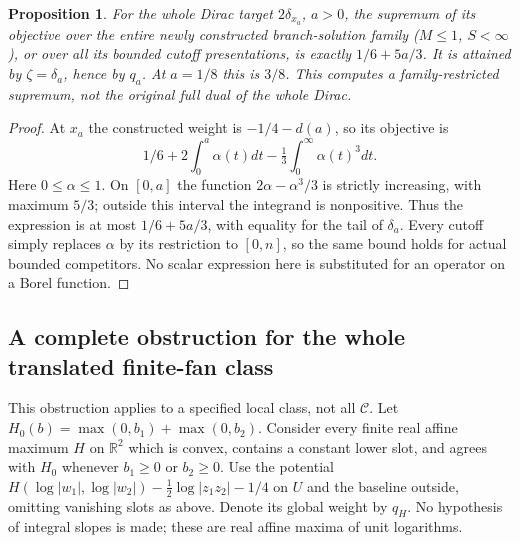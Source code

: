 \documentclass[11pt]{article}
\newtheorem{proposition}[theorem]{Proposition}
\newcommand{\C}{\mathcal C}
\begin{document}
\begin{proposition}\label{branch:diracobjective}
For the whole Dirac target $2\delta_{x_a}$, $a>0$, the supremum of its
objective over the entire newly constructed branch-solution family
($M\le1$, $S<\infty$), or over all its bounded cutoff presentations, is
exactly $1/6+5a/3$. It is attained by $\zeta=\delta_a$, hence by $q_a$.
At $a=1/8$ this is $3/8$. This computes a family-restricted supremum,
not the original full dual of the whole Dirac.
\end{proposition}
\begin{proof}
At $x_a$ the constructed weight is $-1/4-d(a)$, so its objective is
\[
 1/6+2\int_0^a\alpha(t)dt-\tfrac13\int_0^\infty\alpha(t)^3dt.
\]
Here $0\le\alpha\le1$. On $[0,a]$ the function
$2\alpha-\alpha^3/3$ is strictly increasing, with maximum $5/3$;
outside this interval the integrand is nonpositive. Thus the expression
is at most $1/6+5a/3$, with equality for the tail of $\delta_a$.
Every cutoff simply replaces $\alpha$ by its restriction to $[0,n]$,
so the same bound holds for actual bounded competitors. No scalar
expression here is substituted for an operator on a Borel function.
\end{proof}

\subsection{A complete obstruction for the whole translated finite-fan class}
This obstruction applies to a specified local class, not all $\C$.
Let $H_0(b)=\max(0,b_1)+\max(0,b_2)$. Consider every finite real affine
maximum $H$ on $\mathbb R^2$ which is convex, contains a constant lower
slot, and agrees with $H_0$ whenever $b_1\ge0$ or $b_2\ge0$.
Use the potential $H(\log|w_1|,\log|w_2|)-\frac12\log|z_1z_2|-1/4$
on $U$ and the baseline outside, omitting vanishing slots as above.
Denote its global weight by $q_H$. No hypothesis of integral slopes is
made; these are real affine maxima of unit logarithms.
\end{document}
